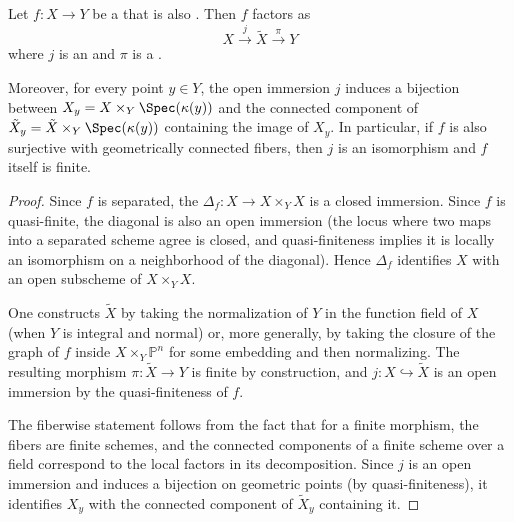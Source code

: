 \begin{theorem} \label{theorem:zariski_main_theorem_grothendieck_form}
    Let $f : X \to Y$ be a  that is also . Then $f$ factors as
    $$ X \xrightarrow{\,j\,} \tilde{X} \xrightarrow{\,\pi\,} Y $$
    where $j$ is an  and $\pi$ is a .

    Moreover, for every point $y \in Y$, the open immersion $j$ induces a bijection between $X_y = X \times_Y \Spec(\kappa(y))$ and the connected component of $\tilde{X}_y = \tilde{X} \times_Y \Spec(\kappa(y))$ containing the image of $X_y$. In particular, if $f$ is also surjective with geometrically connected fibers, then $j$ is an isomorphism and $f$ itself is finite.
\end{theorem}

\begin{proof}
    Since $f$ is separated, the  $\Delta_f : X \to X \times_Y X$ is a closed immersion. Since $f$ is quasi-finite, the diagonal is also an open immersion (the locus where two maps into a separated scheme agree is closed, and quasi-finiteness implies it is locally an isomorphism on a neighborhood of the diagonal). Hence $\Delta_f$ identifies $X$ with an open subscheme of $X \times_Y X$.

    One constructs $\tilde{X}$ by taking the normalization of $Y$ in the function field of $X$ (when $Y$ is integral and normal) or, more generally, by taking the closure of the graph of $f$ inside $X \times_Y \mathbb{P}^n$ for some embedding and then normalizing. The resulting morphism $\pi : \tilde{X} \to Y$ is finite by construction, and $j : X \hookrightarrow \tilde{X}$ is an open immersion by the quasi-finiteness of $f$.

    The fiberwise statement follows from the fact that for a finite morphism, the fibers are finite schemes, and the connected components of a finite scheme over a field correspond to the local factors in its decomposition. Since $j$ is an open immersion and induces a bijection on geometric points (by quasi-finiteness), it identifies $X_y$ with the connected component of $\tilde{X}_y$ containing it.
\end{proof}